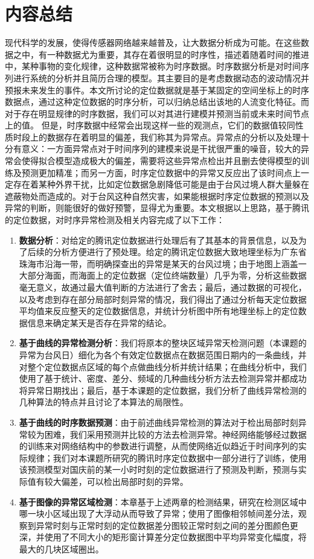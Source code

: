 \documentclass[a4paper,AutoFakeBold,oneside,12pt]{book}
\begin{document}
\section{内容总结}
	现代科学的发展，使得传感器网络越来越普及，让大数据分析成为可能。在这些数据之中，有一种数据尤为重要，其存在着很明显的时序性，描述着随着时间的推进中，某种事物的变化规律，这种数据常被称为时序数据。时序数据分析是对时间序列进行系统的分析并且简历合理的模型。其主要目的是考虑数据动态的波动情况并预报未来发生的事件。本文所讨论的定位数据就是基于某固定的空间坐标上的时序数据点，通过这种定位数据的时序分析，可以归纳总结出该地的人流变化特征。而对于存在明显规律的时序数据，我们可以对其进行建模并预测当前或未来时间节点上的值。
	但是，时序数据中经常会出现这样一些的观测点，它们的数据值较同性质时段上的数据存在着明显的偏差，我们称其为异常点。异常点的分析以及处理十分有意义：一方面异常点对于时间序列的建模来说是干扰很严重的噪音，较大的异常会使得拟合模型造成极大的偏差，需要将这些异常点检出并且删去使得模型的训练及预测更加精准；而另一方面，时序定位数据中的异常又反应出了该时间点上一定存在着某种外界干扰，比如定位数据急剧降低可能是由于台风过境人群大量躲在遮蔽物处而造成的。对于台风这种自然灾害，如果能根据时序定位数据的预测以及异常的判断，则能很好的做好预警，显得尤为重要。本文根据以上思路，基于腾讯的定位数据，对时序异常检测及相关内容完成了以下工作：
\begin{enumerate}
\item \textbf{数据分析}：对给定的腾讯定位数据进行处理后有了其基本的背景信息，以及为了后续的分析方便进行了预处理。给定的腾讯定位数据大致地理坐标为广东省珠海市沿海一带，而明确探查出的异常是某天的台风过境；由于地图上涵盖一大部分海面，而海面上的定位数据（定位终端数量）几乎为零，分析这些数据毫无意义，故通过最大值判断的方法进行了舍去；最后，通过数据的可视化，以及考虑到存在部分局部时刻异常的情况，我们得出了通过分析每天定位数据平均值来反应整天的定位数据信息，并统计分析图中所有地理坐标上的定位数据信息来确定某天是否存在异常的结论。
\item \textbf{基于曲线的异常检测分析}：我们将原本的整块区域异常天检测问题（本课题的异常为台风日）细化为各个有效定位数据点在数据范围日期内的一条曲线，并对整个定位数据点区域的每个点做曲线分析并统计结果；在曲线分析中，我们使用了基于统计、密度、差分、频域的几种曲线分析方法去检测异常并都成功将异常日期找出；最后，基于本课题的定位数据，我们分析了曲线异常检测的几种算法的特点并且讨论了本算法的局限性。
\item \textbf{基于曲线的时序数据预测}：由于前述曲线异常检测的算法对于检出局部时刻异常较为困难，我们采用预测并比较的方法去检测异常。神经网络能够经过数据的训练来对网络结构中的参数进行调整，从而使网络近似趋近于时间序列的实际规律；我们对本课题所研究的腾讯时序定位数据中一部分进行了训练，使用该预测模型对国庆前的某一小时时刻的定位数据进行了预测及判断，预测与实际值有较大偏差，可以检出局部时刻的异常。
\item \textbf{基于图像的异常区域检测}：本章基于上述两章的检测结果，研究在检测区域中哪一块小区域出现了大浮动从而导致了异常；使用了图像相邻帧间差分法，观察到异常时刻与正常时刻的定位数据差分图较正常时刻之间的差分图颜色更深，并使用了不同大小的矩形窗计算差分定位数据图中平均异常变化幅度，将最大的几块区域圈出。
\end{enumerate}
\end{document}
